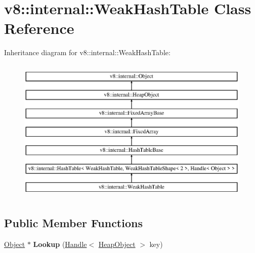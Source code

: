 \hypertarget{classv8_1_1internal_1_1_weak_hash_table}{}\section{v8\+:\+:internal\+:\+:Weak\+Hash\+Table Class Reference}
\label{classv8_1_1internal_1_1_weak_hash_table}
Inheritance diagram for v8\+:\+:internal\+:\+:Weak\+Hash\+Table\+:\begin{figure}[H]
\begin{center}
\leavevmode
\includegraphics[height=7.000000cm]{classv8_1_1internal_1_1_weak_hash_table}
\end{center}
\end{figure}
\subsection*{Public Member Functions}
\begin{DoxyCompactItemize}
\item 
\hyperlink{classv8_1_1internal_1_1_object}{Object} $\ast$ {\bfseries Lookup} (\hyperlink{classv8_1_1internal_1_1_handle}{Handle}$<$ \hyperlink{classv8_1_1internal_1_1_heap_object}{Heap\+Object} $>$ key)\hypertarget{classv8_1_1internal_1_1_weak_hash_table_ad6c61dafba57bfd55f6a9c636858de42}{}\label{classv8_1_1internal_1_1_weak_hash_table_ad6c61dafba57bfd55f6a9c636858de42}

\end{DoxyCompactItemize}
